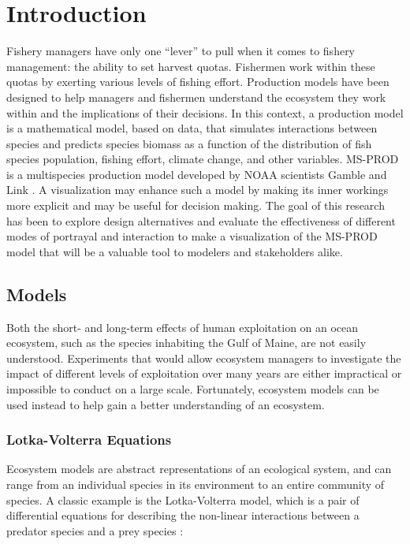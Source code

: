 \chapter{Introduction} 

\renewcommand{\thepart}{{\Roman{part}}}	

Fishery managers have only one ``lever'' to pull when it comes to fishery management: the ability to set harvest quotas.  Fishermen work within these quotas by exerting various levels of fishing effort.  Production models have been designed to help managers and fishermen understand the ecosystem they work within and the implications of their decisions.  In this context, a production model is a mathematical model, based on data, that simulates interactions between species and predicts species biomass as a function of the distribution of fish species population, fishing effort, climate change, and other variables.  MS-PROD is a multispecies production model developed by NOAA scientists Gamble and Link \citeyearpar{gamble2009}.  A visualization may enhance such a model by making its inner workings more explicit and may be useful for decision making. The goal of this research has been to explore design alternatives and evaluate the effectiveness of different modes of portrayal and interaction to make a visualization of the MS-PROD model that will be a valuable tool to modelers and stakeholders alike. 

\section{Models}

Both the short- and long-term effects of human exploitation on an ocean ecosystem, such as the species inhabiting the Gulf of Maine, are not easily understood.  Experiments that would allow ecosystem managers to investigate the impact of different levels of exploitation over many years are either impractical or impossible to conduct on a large scale.  Fortunately, ecosystem models can be used instead to help gain a better understanding of an ecosystem.

\subsection{Lotka-Volterra Equations}

Ecosystem models are abstract representations of an ecological system, and can range from an individual species in its environment to an entire community of species.  A classic example is the Lotka-Volterra model, which is a pair of differential equations for describing the non-linear interactions between a predator species and a prey species \cite{lotka1926, volterra1926}:

